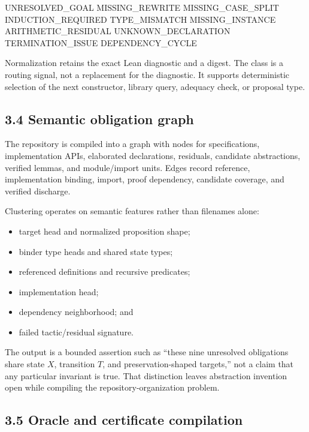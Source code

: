 \documentclass[
  10pt,
]{article}
\newenvironment{Shaded}{}{}
\newcommand{\NormalTok}[1]{#1}
\providecommand{\tightlist}{%
  \setlength{\itemsep}{0pt}\setlength{\parskip}{0pt}}
\begin{document}
\begin{Shaded}
\begin{Highlighting}[]
\NormalTok{UNRESOLVED\_GOAL          MISSING\_REWRITE}
\NormalTok{MISSING\_CASE\_SPLIT       INDUCTION\_REQUIRED}
\NormalTok{TYPE\_MISMATCH            MISSING\_INSTANCE}
\NormalTok{ARITHMETIC\_RESIDUAL      UNKNOWN\_DECLARATION}
\NormalTok{TERMINATION\_ISSUE        DEPENDENCY\_CYCLE}
\end{Highlighting}
\end{Shaded}

Normalization retains the exact Lean diagnostic and a digest. The class
is a routing signal, not a replacement for the diagnostic. It supports
deterministic selection of the next constructor, library query, adequacy
check, or proposal type.

\subsection{3.4 Semantic obligation
graph}\label{semantic-obligation-graph}

The repository is compiled into a graph with nodes for specifications,
implementation APIs, elaborated declarations, residuals, candidate
abstractions, verified lemmas, and module/import units. Edges record
reference, implementation binding, import, proof dependency, candidate
coverage, and verified discharge.

Clustering operates on semantic features rather than filenames alone:

\begin{itemize}
\tightlist
\item
  target head and normalized proposition shape;
\item
  binder type heads and shared state types;
\item
  referenced definitions and recursive predicates;
\item
  implementation head;
\item
  dependency neighborhood; and
\item
  failed tactic/residual signature.
\end{itemize}

The output is a bounded assertion such as ``these nine unresolved
obligations share state \(X\), transition \(T\), and preservation-shaped
targets,'' not a claim that any particular invariant is true. That
distinction leaves abstraction invention open while compiling the
repository-organization problem.

\subsection{3.5 Oracle and certificate
compilation}\label{oracle-and-certificate-compilation}
\end{document}

